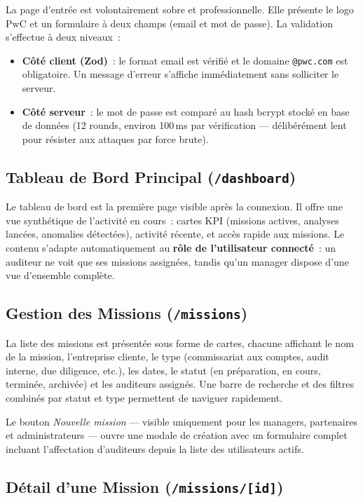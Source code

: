 La page d'entrée est volontairement sobre et professionnelle. Elle présente le logo PwC et un formulaire à deux champs (email et mot de passe). La validation s'effectue à deux niveaux~:

\begin{itemize}[leftmargin=1.5em]
  \item \textbf{Côté client (Zod)}~: le format email est vérifié et le domaine \texttt{@pwc.com} est obligatoire. Un message d'erreur s'affiche immédiatement sans solliciter le serveur.
  \item \textbf{Côté serveur}~: le mot de passe est comparé au hash bcrypt stocké en base de données (12 rounds, environ 100\,ms par vérification --- délibérément lent pour résister aux attaques par force brute).
\end{itemize}

\subsection{Tableau de Bord Principal (\texttt{/dashboard})}

Le tableau de bord est la première page visible après la connexion. Il offre une vue synthétique de l'activité en cours~: cartes KPI (missions actives, analyses lancées, anomalies détectées), activité récente, et accès rapide aux missions. Le contenu s'adapte automatiquement au \textbf{rôle de l'utilisateur connecté}~: un auditeur ne voit que ses missions assignées, tandis qu'un manager dispose d'une vue d'ensemble complète.

\subsection{Gestion des Missions (\texttt{/missions})}

La liste des missions est présentée sous forme de cartes, chacune affichant le nom de la mission, l'entreprise cliente, le type (commissariat aux comptes, audit interne, due diligence, etc.), les dates, le statut (en préparation, en cours, terminée, archivée) et les auditeurs assignés. Une barre de recherche et des filtres combinés par statut et type permettent de naviguer rapidement.

Le bouton \textit{Nouvelle mission} --- visible uniquement pour les managers, partenaires et administrateurs --- ouvre une modale de création avec un formulaire complet incluant l'affectation d'auditeurs depuis la liste des utilisateurs actifs.

\subsection{Détail d'une Mission (\texttt{/missions/[id]})}

